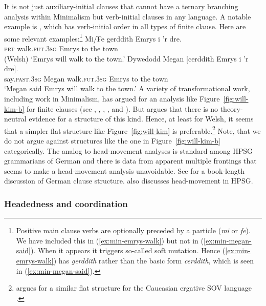 \documentclass[output=paper]{langsci/langscibook}
\begin{document}
It is not just  auxiliary-initial clauses that cannot have a ternary branching analysis
within Minimalism but verb-initial clauses in any language. A notable example is , which
has verb-initial order in all types of finite clause. Here are some relevant examples:\footnote{%
	Positive main clause verbs are optionally preceded by a particle (\emph{mi} or \emph{fe}). We have included this in (\ref{ex:min-emrys-walk}) but not in (\ref{ex:min-megan-said}). When it appears it triggers so-called soft mutation. Hence (\ref{ex:min-emrys-walk}) has \emph{gerddith} rather than the basic form \emph{cerddith}, which is seen in (\ref{ex:min-megan-said}).
}
\eal
\ex\label{ex:min-emrys-walk}
\gll Mi/Fe gerddith Emrys i 'r dre.\\
     \textsc{prt} walk.\textsc{fut}.\textsc{3sg} Emrys to the town\\\hfill(Welsh)
\glt `Emrys will walk to the town.'
\ex\label{ex:min-megan-said}
\gll Dywedodd Megan [cerddith Emrys i 'r dre].\\
     say.\textsc{past}.\textsc{3sg} Megan \spacebr{}walk.\textsc{fut}.\textsc{3sg} Emrys to the town\\
\glt `Megan said Emrys will walk to the town.'
\zl
A variety of transformational work, including work in Minimalism, has argued for an analysis like Figure~\ref{fig:will-kim-b} for  finite clauses (see \eg \citealt{JonesThomas.1977}, \citealt{Sproat.1985}, \citealt{Sadler.1988}, \citealt{Rouveret.1994}, and \citealt{Roberts.2005}). But \citet{Borsley.2006b} argues that there is no theory-neutral evidence for a structure of this kind. Hence, at least for Welsh, it seems that a simpler flat structure like Figure~\ref{fig:will-kim} is preferable.\footnote{%
	\citet{Borsley.2016} argues for a similar flat structure for the Caucasian ergative SOV language .%
} Note, that we do not argue against structures like the one in Figure~\ref{fig:will-kim-b}
categorically. The analog to head-movement analyses is standard among HPSG grammarians of German and there is data from apparent multiple
frontings that seems to make a head-movement analysis unavoidable. See  for a
book-length discussion of German clause structure.  also discusses
head-movement in HPSG.


\subsubsection{Headedness and coordination}
\label{sec-coordination-minimalism}
\end{document}
